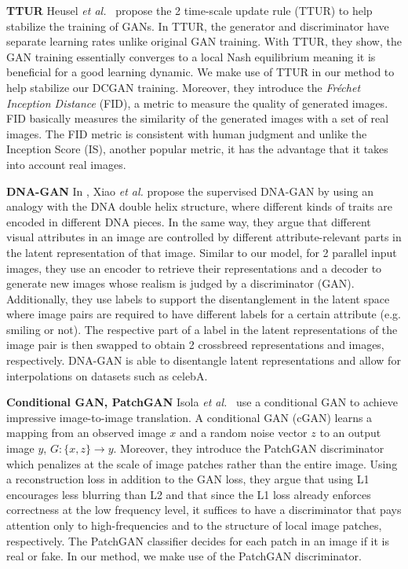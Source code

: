 \documentclass[a4paper,12pt]{report}
\begin{document}
\par \textbf{TTUR} Heusel \textit{et al.}~\cite{TTUR} propose the 2 time-scale
update rule (TTUR) to help stabilize the training of GANs. In TTUR, the generator and discriminator have separate learning rates unlike original GAN training. With TTUR, they show, the GAN training essentially converges to a local Nash equilibrium meaning it is beneficial for a good learning dynamic. We make use of TTUR in our method to help stabilize our DCGAN training. Moreover, they introduce the \textit{Fréchet Inception Distance} (FID), a metric to measure the quality of generated images. FID basically measures the similarity of the generated images with a set of real images. The FID metric is consistent with human judgment and unlike the Inception Score (IS), another popular metric, it has the advantage that it takes into account real images.

\par \textbf{DNA-GAN} In \cite{DnaGan}, Xiao \textit{et al.} propose the supervised DNA-GAN by using an analogy with the DNA double helix structure, where different kinds of traits are encoded in different DNA pieces. In the same way, they argue that different visual attributes in an image are controlled by different attribute-relevant parts in the latent representation of that image. Similar to our model, for 2 parallel input images, they use an encoder to retrieve their representations and a decoder to generate new images whose realism is judged by a discriminator (GAN). Additionally, they use labels to support the disentanglement in the latent space where image pairs are required to have different labels for a certain attribute (e.g. smiling or not). The respective part of a label in the latent representations of the image pair is then swapped to obtain 2 crossbreed representations and images, respectively. DNA-GAN is able to disentangle latent representations and allow for interpolations on datasets such as celebA.

\par \textbf{Conditional GAN, PatchGAN} Isola \textit{et al.}~\cite{CondGAN_PatchGAN} use a conditional GAN to achieve impressive image-to-image translation. A conditional GAN (cGAN) learns a mapping from an observed image $x$ and a random noise vector $z$ to an output image $y$, $G : \{x,z\} \rightarrow y$. Moreover, they introduce the PatchGAN discriminator which penalizes at the scale of image patches rather than the entire image. Using a reconstruction loss in addition to the GAN loss, they argue that using L1 encourages less blurring than L2 and that since the L1 loss already enforces correctness at the low frequency level, it suffices to have a discriminator that pays attention only to high-frequencies and to the structure of local image patches, respectively. The PatchGAN classifier decides for each patch in an image if it is real or fake. In our method, we make use of the PatchGAN discriminator.
\end{document}
